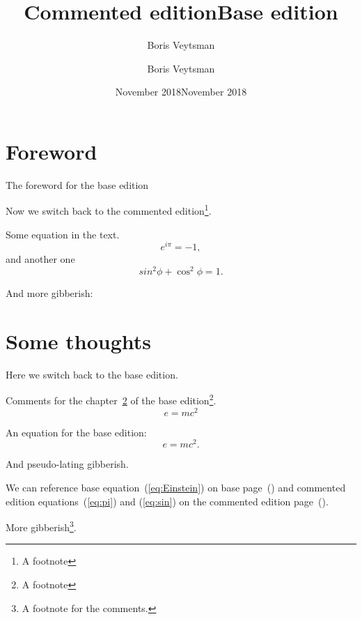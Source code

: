 \documentclass{book}
\title{Commented edition}
\author{Boris Veytsman}
\date{November 2018}
\begin{document}
\frontmatter
\title{Base edition}
\author{Boris Veytsman}
\date{November 2018}
\maketitle

\chapter{Foreword}
\label{chap:foreword}

The foreword for the base edition

\lipsum[1-5]

\begin{commeditText}

  Now we switch back to the commented edition\footnote{A footnote}.
  
  Some equation in the text.
  \begin{equation}
    \label{eq:pi}
    e^{i\pi}=-1,
  \end{equation}
  and another one
  \begin{equation}
    \label{eq:sin}
    sin^2\phi+\cos^2\phi=1.
  \end{equation}

  And more gibberish:

  \kant[5-12]
  
\end{commeditText}

\mainmatter

\chapter{Some thoughts}
\label{chap:thoughts}

Here we switch back to the base edition.  
\begin{commeditComments}
  Comments for the chapter~\ref{chap:thoughts} of the base
  edition\footnote{A footnote}.
  \begin{equation}
    e=mc^2
  \end{equation}
  \kant[6]
\end{commeditComments}

An equation for the base edition:
\begin{equation}
  \label{eq:Einstein}
  e=mc^2.
\end{equation}

And pseudo-lating gibberish.

\lipsum[6-12]


\begin{commeditComments}
  We can reference base equation~(\ref{eq:Einstein}) on base
  page~(\pageref{eq:Einstein}) and commented edition
  equations~(\ref{eq:pi}) and (\ref{eq:sin}) on the commented edition
  page~(\pageref{eq:pi}).

  More gibberish\footnote{A footnote for the comments.}.
  
  \kant[7]
\end{commeditComments}
\end{document}
